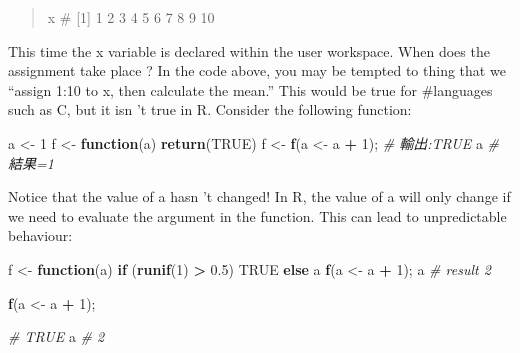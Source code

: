 \documentclass[]{book}
\newenvironment{Shaded}{\begin{snugshade}}{\end{snugshade}}
\newcommand{\KeywordTok}[1]{\textcolor[rgb]{0.13,0.29,0.53}{\textbf{#1}}}
\newcommand{\DecValTok}[1]{\textcolor[rgb]{0.00,0.00,0.81}{#1}}
\newcommand{\FloatTok}[1]{\textcolor[rgb]{0.00,0.00,0.81}{#1}}
\newcommand{\StringTok}[1]{\textcolor[rgb]{0.31,0.60,0.02}{#1}}
\newcommand{\CommentTok}[1]{\textcolor[rgb]{0.56,0.35,0.01}{\textit{#1}}}
\newcommand{\OtherTok}[1]{\textcolor[rgb]{0.56,0.35,0.01}{#1}}
\newcommand{\ControlFlowTok}[1]{\textcolor[rgb]{0.13,0.29,0.53}{\textbf{#1}}}
\newcommand{\OperatorTok}[1]{\textcolor[rgb]{0.81,0.36,0.00}{\textbf{#1}}}
\newcommand{\NormalTok}[1]{#1}
\theoremstyle{definition}
\theoremstyle{definition}
\theoremstyle{definition}
\theoremstyle{remark}
\begin{document}
\begin{quote}
x \# {[}1{]} 1 2 3 4 5 6 7 8 9 10
\end{quote}

This time the x variable is declared within the user workspace. When
does the assignment take place ? In the code above, you may be tempted
to thing that we ``assign 1:10 to x, then calculate the mean.'' This
would be true for \#languages such as C, but it isn 't true in R.
Consider the following function:

\begin{Shaded}
\begin{Highlighting}[]
\NormalTok{a <-}\StringTok{ }\DecValTok{1}
\NormalTok{f <-}\StringTok{ }\ControlFlowTok{function}\NormalTok{(a) }\KeywordTok{return}\NormalTok{(}\OtherTok{TRUE}\NormalTok{)}
\NormalTok{f <-}\StringTok{ }\KeywordTok{f}\NormalTok{(a <-}\StringTok{ }\NormalTok{a }\OperatorTok{+}\StringTok{ }\DecValTok{1}\NormalTok{);}
\CommentTok{# 輸出:TRUE}
\NormalTok{a }\CommentTok{# 結果=1 }
\end{Highlighting}
\end{Shaded}

Notice that the value of a hasn 't changed! In R, the value of a will
only change if we need to evaluate the argument in the function. This
can lead to unpredictable behaviour:

\begin{Shaded}
\begin{Highlighting}[]
\NormalTok{f <-}\StringTok{ }\ControlFlowTok{function}\NormalTok{(a) }\ControlFlowTok{if}\NormalTok{ (}\KeywordTok{runif}\NormalTok{(}\DecValTok{1}\NormalTok{) }\OperatorTok{>}\StringTok{ }\FloatTok{0.5}\NormalTok{) }\OtherTok{TRUE} \ControlFlowTok{else}\NormalTok{ a}
    \KeywordTok{f}\NormalTok{(a <-}\StringTok{ }\NormalTok{a }\OperatorTok{+}\StringTok{ }\DecValTok{1}\NormalTok{);}
\NormalTok{a }\CommentTok{# result 2}
\end{Highlighting}
\end{Shaded}

\begin{Shaded}
\begin{Highlighting}[]
\KeywordTok{f}\NormalTok{(a <-}\StringTok{ }\NormalTok{a }\OperatorTok{+}\StringTok{ }\DecValTok{1}\NormalTok{);}
\end{Highlighting}
\end{Shaded}

\begin{Shaded}
\begin{Highlighting}[]
\CommentTok{# TRUE}
\NormalTok{a }\CommentTok{# 2}
\end{Highlighting}
\end{Shaded}
\end{document}
